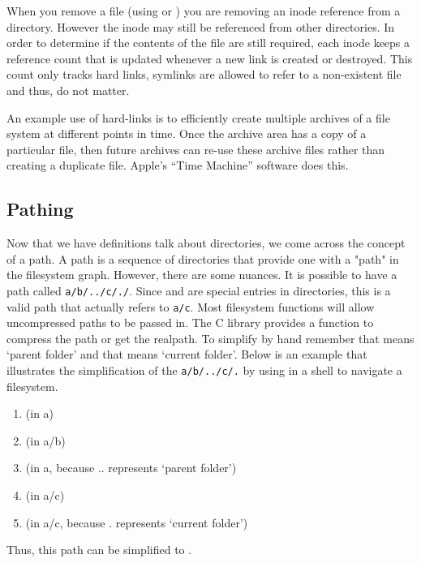 When you remove a file (using  or ) you are removing an inode reference from a directory. However the inode may still be referenced from other directories. In order to determine if the contents of the file are still required, each inode keeps a reference count that is updated whenever a new link is created or destroyed. This count only tracks hard links, symlinks are allowed to refer to a non-existent file and thus, do not matter.

An example use of hard-links is to efficiently create multiple archives of a file system at different points in time. Once the archive area has a copy of a particular file, then future archives can re-use these archive files rather than creating a duplicate file. Apple's ``Time Machine'' software does this.

\subsection{Pathing}

Now that we have definitions talk about directories, we come across the concept of a path. A path is a sequence of directories that provide one with a "path" in the filesystem graph. However, there are some nuances. It is possible to have a path called \texttt{a/b/../c/./}. Since  and  are special entries in directories, this is a valid path that actually refers to \texttt{a/c}. Most filesystem functions will allow uncompressed paths to be passed in. The C library provides a function  to compress the path or get the realpath. To simplify by hand remember that  means `parent folder' and that  means `current folder'. Below is an example that illustrates the simplification of the \texttt{a/b/../c/.} by using  in a shell to navigate a filesystem.

\begin{enumerate}
  \item {} (in a)
  \item {} (in a/b)
  \item {} (in a, because .. represents `parent folder')
  \item {} (in a/c)
  \item {} (in a/c, because . represents `current folder')
\end{enumerate}

Thus, this path can be simplified to .

